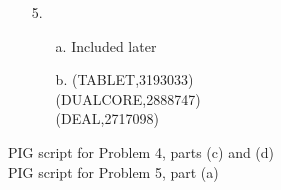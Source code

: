 \documentclass{article}
\begin{document}
\begin{itemize}
\pagebreak
\setlength{\headsep}{5pt}
\item[5.]
	\begin{itemize}
		\item[a.] Included later 
		\item[b.]
			(TABLET,3193033)\\
			(DUALCORE,2888747)\\
			(DEAL,2717098)
	\end{itemize}

\end{itemize}

\pagebreak
PIG script for Problem 4, parts (c) and (d)\\


\pagebreak
PIG script for Problem 5, part (a)\\

\end{document}
